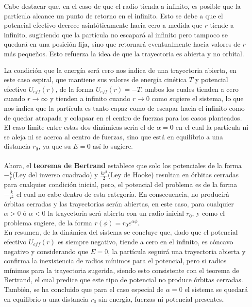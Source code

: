 \documentclass[../main.tex]{subfiles}
\begin{document}
Cabe destacar que, en el caso de que el radio tienda a infinito, es posible que la partícula alcance un punto de retorno en el infinito. Esto se debe a que el potencial efectivo decrece asintóticamente hacia cero a medida que $r$ tiende a infinito, sugiriendo que la partícula no escapará al infinito pero tampoco se quedará en una posición fija, sino que retornará eventualmente hacia valores de $r$ más pequeños. Esto refuerza la idea de que la trayectoria es abierta y no orbital.

La condición que la energía será cero nos indica de una trayectoria abierta, en este caso espiral, que mantiene sus valores de energía cinética $T$ y potencial efectivo $U_{eff}(r)$, de la forma $U_{eff}(r)=-T$, ambos los cuales tienden a cero cuando $r\to \infty$ y tienden a infinito cuando $r\to 0$ como sugiere el sistema, lo que nos indica que la partícula es tanto capaz como de escapar hacia el infinito como de quedar atrapada y colapsar en el centro de fuerzas para los casos planteados. \\

El caso límite entre estas dos dinámicas seria el de $\alpha=0$ en el cual la partícula ni se aleja ni se acerca al centro de fuerzas, sino que está en equilibrio a una distancia $r_0$, ya que su $E=0$ así lo sugiere.
\\
\\
Ahora, el \textbf{teorema de Bertrand} establece que solo los potenciales de la forma $-\frac{k}{r}$(Ley del inverso cuadrado) y $\frac{kr^2}{2}$(Ley de Hooke)
resultan en órbitas cerradas para cualquier condición inicial, pero, el potencial del problema es de la forma $-\frac{k}{r^2}$ el cual no cabe dentro de esta categoría. En consecuencia, no producirá órbitas cerradas y las trayectorias serán abiertas, en este caso, para cualquier $\alpha>0$ ó $ \alpha<0$ la trayectoria será abierta con un radio inicial $r_0$, y como el problema sugiere, de la forma $r(\phi)=r_0e^{\alpha \phi}$.\\
En resumen, de la dinámica del sistema se concluye que, dado que el potencial efectivo $U_{eff}(r)$ es siempre negativo, tiende a cero en el infinito, es cóncavo negativo y considerando que $E=0$, la partícula seguirá una trayectoria abierta y confirma la inexistencia de radios mínimos para el potencial, pero si radios mínimos para la trayectoria sugerida, siendo esto consistente con el teorema de Bertrand, el cual predice que este tipo de potencial no produce órbitas cerradas. También, se ha concluido que para el caso especial de $\alpha=0$ el sistema se quedará en equilibrio a una distancia $r_0$ sin energía, fuerzas ni potencial presentes.
\end{document}
